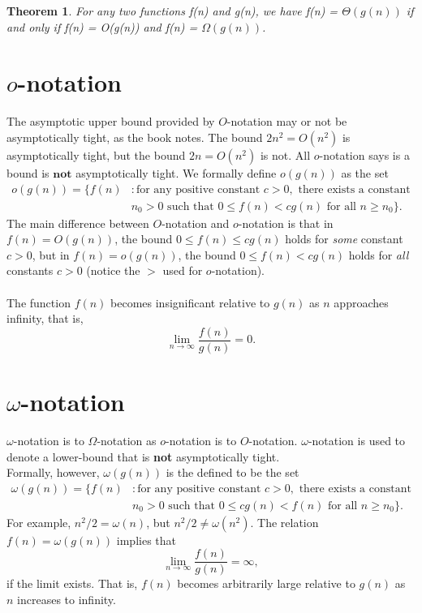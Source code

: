 \documentclass{article}
\newtheorem{theorem}{Theorem}
\begin{document}
\begin{theorem}
For any two functions f(n) and g(n), we have f(n) = $\Theta{(g(n))}$ if and only if f(n) = O(g(n)) and f(n) = $\Omega{(g(n))}$.
\end{theorem}
\newpage


\section*{$o$-notation}
The asymptotic upper bound provided by $O$-notation may or not be asymptotically tight, as the book notes. The bound $2n^2=O(n^2)$ is asymptotically tight, but the bound $2n=O(n^2)$ is not. All $o$-notation says is a bound is $\textbf{not}$ asymptotically tight.\newline
We formally define $o(g(n))$ as the set
\begin{equation*}
\begin{split}
o{(g(n))} = \{f(n) & : \text{for any positive constant } c > 0,\text{ there exists a constant}\\
  & n_0 > 0 \text{ such that } 0 \leq f(n) < cg(n) \text{ for all } n \geq n_0\}.
\end{split}
\end{equation*}
The main difference between $O$-notation and $o$-notation is that in $f(n)=O(g(n))$, the bound $0 \leq f(n) \leq cg(n)$ holds for \textit{some} constant $c > 0$, but in $f(n)=o(g(n))$, the bound $0 \leq f(n) < cg(n)$ holds for \textit{all} constants $c > 0$ (notice the $>$ used for $o$-notation).
\\ \\
The function $f(n)$ becomes insignificant relative to $g(n)$ as $n$ approaches infinity, that is,
\newline
$$\lim_{n\to\infty} \frac{f(n)}{g(n)} = 0.$$


\section*{$\omega$-notation}
$\omega$-notation is to $\Omega$-notation as $o$-notation is to $O$-notation. $\omega$-notation is used to denote a lower-bound that is \textbf{not} asymptotically tight.\\
Formally, however, $\omega(g(n))$ is the defined to be the set\newline
\begin{equation*}
\begin{split}
\omega{(g(n))} = \{f(n) & : \text{for any positive constant } c > 0,\text{ there exists a constant}\\
  & n_0 > 0 \text{ such that } 0 \leq cg(n) < f(n) \text{ for all } n \geq n_0\}.
\end{split}
\end{equation*}
For example, $n^2/2 = \omega{(n)}$, but $n^2/2 \neq \omega{(n^2)}$. The relation $f(n) = \omega{(g(n))}$ implies that\newline
$$\lim_{n\to\infty} \frac{f(n)}{g(n)} = \infty,$$
if the limit exists. That is, $f(n)$ becomes arbitrarily large relative to $g(n)$ as $n$ increases to infinity.
\end{document}
